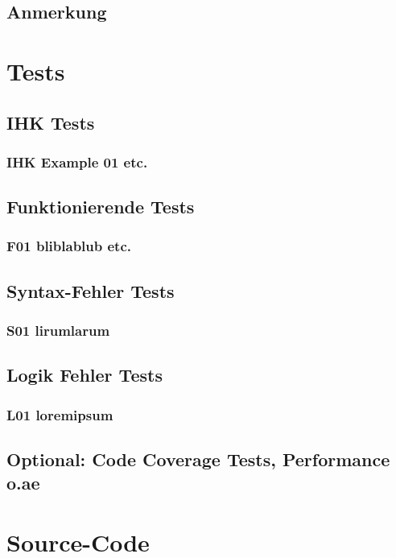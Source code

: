 \documentclass[a4paper,11pt]{article}
\begin{document}
{\subsection{Anmerkung}

\section{Tests}

\subsection{IHK Tests}

\subsubsection{IHK Example 01 etc.}

\subsection{Funktionierende Tests}

\subsubsection{F01 bliblablub etc.}

\subsection{Syntax-Fehler Tests}

\subsubsection{S01 lirumlarum}

\subsection{Logik Fehler Tests}

\subsubsection{L01 loremipsum}

\subsection{Optional: Code Coverage Tests, Performance o.ae}

\section{Source-Code}
}
\end{document}
